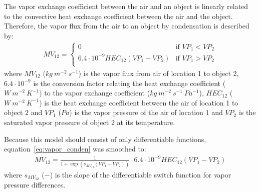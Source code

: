 \documentclass[a4paper]{article}
\numberwithin{equation}{section}
\begin{document}
The vapor exchange coefficient between the air and an object is linearly related to the convective heat exchange coefficient between the air and the object.
Therefore, the vapor flux from the air to an object by condensation is described by:
\begin{align}
  \label{eq:vapor_conden}
  MV_{12} = \begin{cases}
    0                                       & \text{if~} VP_1 < VP_2 \\
    6.4 \cdot 10^{-9} HEC_{12}(VP_1 - VP_2) & \text{if~} VP_1 > VP_2 \\
  \end{cases}
\end{align}
where \( MV_{12} \) (\( kg\ m^{-2}\ s^{-1} \)) is the vapor flux from air of location 1 to object 2, \( 6.4 \cdot 10^{-9} \) is the conversion factor relating the heat exchange coefficient (\( W\ m^{-2}\ K^{-1} \)) to the vapor exchange coefficient (\( kg\ m^{-2}\ s^{-1}\ Pa^{-1} \)), \( HEC_{12} \) (\( W\ m^{-2}\ K^{-1} \)) is the heat exchange coefficient between the air of location 1 to object 2 and \( VP_1 \) (\( Pa \)) is the vapor pressure of the air of location 1 and \( VP_2 \) is the saturated vapor pressure of object 2 at its temperature.

Because this model should consist of only differentiable functions, equation~\eqref{eq:vapor_conden} was smoothed to:
\begin{align}
  MV_{12} = \frac{1}{1 + \exp \left(s_{MV_{12}} (VP_1 - VP_2)\right)} \cdot 6.4 \cdot 10^{-9} HEC_{12} (VP_1 - VP_2)
\end{align}
where \( s_{MV_{12}} \) (\( - \)) is the slope of the differentiable switch function for vapor pressure differences.
\end{document}
